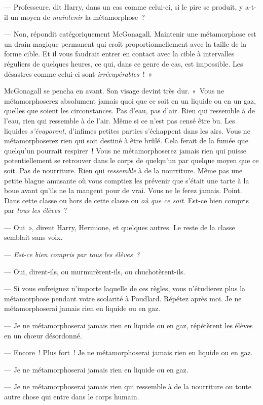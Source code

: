 --- Professeure, dit Harry, dans un cas comme celui-ci, si le pire se produit, y a-t-il un moyen de \emph{maintenir} la métamorphose~?

--- Non, répondit catégoriquement McGonagall.
Maintenir une métamorphose est un drain magique permanent qui croît proportionnellement avec la taille de la forme cible.
Et il vous faudrait entrer en contact avec la cible à intervalles réguliers de quelques heures, ce qui, dans ce genre de cas, est impossible.
Les désastres comme celui-ci sont \emph{irrécupérables}~!~»

McGonagall se pencha en avant. Son visage devint très dur.
«~Vous ne métamorphoserez absolument jamais quoi que ce soit en un liquide ou en un gaz, quelles que soient les circonstances.
Pas d'eau, pas d'air.
Rien qui ressemble à de l'eau, rien qui ressemble à de l'air.
Même si ce n'est pas censé être bu.
Les liquides \emph{s'évaporent}, d'infimes petites parties s'échappent dans les airs.
Vous ne métamorphoserez rien qui soit destiné à être brûlé.
Cela ferait de la fumée que quelqu'un pourrait respirer~!
Vous ne métamorphoserez jamais rien qui puisse potentiellement se retrouver dans le corps de quelqu'un par quelque moyen que ce soit.
Pas de nourriture.
Rien qui \emph{ressemble} à de la nourriture.
Même pas une petite blague amusante où vous comptiez les prévenir que s'était une tarte à la boue avant qu'ils ne la mangent pour de vrai.
Vous ne le ferez jamais.
Point.
Dans cette classe ou hors de cette classe ou \emph{où que ce soit}.
Est-ce bien compris par \emph{tous les élèves}~?

--- Oui~», dirent Harry, Hermione, et quelques autres. Le reste de la classe semblait sans voix.

--- \emph{Est-ce bien compris par tous les élèves~?}

--- Oui, dirent-ils, ou murmurèrent-ils, ou chuchotèrent-ils.

--- Si vous enfreignez n'importe laquelle de ces règles, vous n'étudierez plus la métamorphose pendant votre scolarité à Poudlard.
Répétez après moi.
Je ne métamorphoserai jamais rien en liquide ou en gaz.

--- Je ne métamorphoserai jamais rien en liquide ou en gaz, répétèrent les élèves en un chœur désordonné.

--- Encore~! Plus fort~! Je ne métamorphoserai jamais rien en liquide ou en gaz.

--- Je ne métamorphoserai jamais rien en liquide ou en gaz.

--- Je ne métamorphoserai jamais rien qui ressemble à de la nourriture ou toute autre chose qui entre dans le corps humain.

